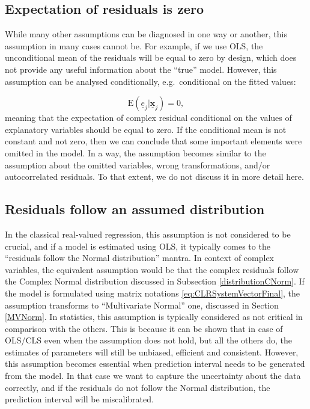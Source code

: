 \documentclass[
]{book}
\begin{document}
\hypertarget{expectation-of-residuals-is-zero}{%
\subsection{Expectation of residuals is zero}\label{expectation-of-residuals-is-zero}}

While many other assumptions can be diagnosed in one way or another, this assumption in many cases cannot be. For example, if we use OLS, the unconditional mean of the residuals will be equal to zero by design, which does not provide any useful information about the ``true'' model. However, this assumption can be analysed conditionally, e.g.~conditional on the fitted values:

\begin{equation}
    \mathrm{E}(\underline{e}_j | \underline{\mathbf{x}}_j)=0 ,
    \label{eq:residsExpectation}
\end{equation}
meaning that the expectation of complex residual conditional on the values of explanatory variables should be equal to zero. If the conditional mean is not constant and not zero, then we can conclude that some important elements were omitted in the model. In a way, the assumption becomes similar to the assumption about the omitted variables, wrong transformations, and/or autocorrelated residuals. To that extent, we do not discuss it in more detail here.

\hypertarget{residuals-follow-an-assumed-distribution}{%
\subsection{Residuals follow an assumed distribution}\label{residuals-follow-an-assumed-distribution}}

In the classical real-valued regression, this assumption is not considered to be crucial, and if a model is estimated using OLS, it typically comes to the ``residuals follow the Normal distribution'' mantra. In context of complex variables, the equivalent assumption would be that the complex residuals follow the Complex Normal distribution discussed in Subsection \ref{distributionCNorm}. If the model is formulated using matrix notations \eqref{eq:CLRSystemVectorFinal}, the assumption transforms to ``Multivariate Normal'' one, discussed in Section \ref{MVNorm}. In statistics, this assumption is typically considered as not critical in comparison with the others. This is because it can be shown that in case of OLS/CLS even when the assumption does not hold, but all the others do, the estimates of parameters will still be unbiased, efficient and consistent. However, this assumption becomes essential when prediction interval needs to be generated from the model. In that case we want to capture the uncertainty about the data correctly, and if the residuals do not follow the Normal distribution, the prediction interval will be miscalibrated.
\end{document}

